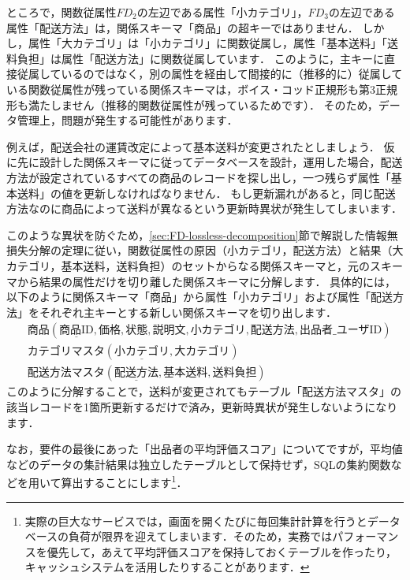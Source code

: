ところで，関数従属性$FD_2$の左辺である属性「小カテゴリ」，$FD_3$の左辺である属性「配送方法」は，関係スキーマ「商品」の超キーではありません．
しかし，属性「大カテゴリ」は「小カテゴリ」に関数従属し，属性「基本送料」「送料負担」は属性「配送方法」に関数従属しています．
このように，主キーに直接従属しているのではなく，別の属性を経由して間接的に（推移的に）従属している関数従属性が残っている関係スキーマは，ボイス・コッド正規形も第3正規形も満たしません（推移的関数従属性が残っているためです）．
そのため，データ管理上，問題が発生する可能性があります．

例えば，配送会社の運賃改定によって基本送料が変更されたとしましょう．
仮に先に設計した関係スキーマに従ってデータベースを設計，運用した場合，配送方法が設定されているすべての商品のレコードを探し出し，一つ残らず属性「基本送料」の値を更新しなければなりません．
もし更新漏れがあると，同じ配送方法なのに商品によって送料が異なるという更新時異状が発生してしまいます．

このような異状を防ぐため，\ref{sec:FD-lossless-decomposition}節で解説した情報無損失分解の定理に従い，関数従属性の原因（小カテゴリ，配送方法）と結果（大カテゴリ，基本送料，送料負担）のセットからなる関係スキーマと，元のスキーマから結果の属性だけを切り離した関係スキーマに分解します．
具体的には，以下のように関係スキーマ「商品」から属性「小カテゴリ」および属性「配送方法」をそれぞれ主キーとする新しい関係スキーマを切り出します．
\begin{align}
&\textbf{商品}(\underline{\text{商品ID}}, \text{価格}, \text{状態}, \text{説明文}, \text{小カテゴリ}, \text{配送方法}, \text{出品者\_ユーザID}) \\
&\textbf{カテゴリマスタ}(\underline{\text{小カテゴリ}}, \text{大カテゴリ}) \\
&\textbf{配送方法マスタ}(\underline{\text{配送方法}}, \text{基本送料}, \text{送料負担})
\end{align}
このように分解することで，送料が変更されてもテーブル「配送方法マスタ」の該当レコードを1箇所更新するだけで済み，更新時異状が発生しないようになります．

なお，要件の最後にあった「出品者の平均評価スコア」についてですが，平均値などのデータの集計結果は独立したテーブルとして保持せず，SQLの集約関数などを用いて算出することにします\footnote{実際の巨大なサービスでは，画面を開くたびに毎回集計計算を行うとデータベースの負荷が限界を迎えてしまいます．そのため，実務ではパフォーマンスを優先して，あえて平均評価スコアを保持しておくテーブルを作ったり，キャッシュシステムを活用したりすることがあります．}．

